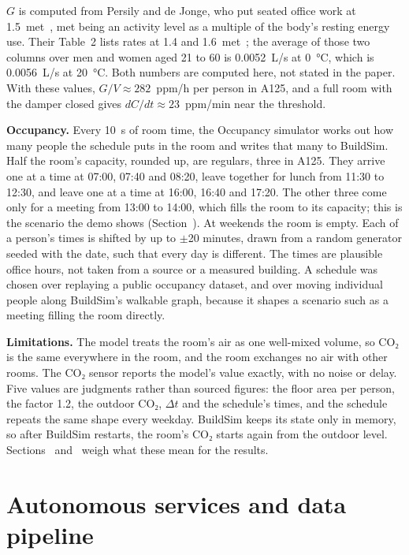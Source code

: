 \documentclass[11pt]{article}
\def\ref#1{\getrefnumber{#1}}%
\begin{document}
$G$ is computed from Persily and de Jonge, who put seated office work at
1.5~met~\cite[p.~3]{persily2017}, met being an activity level as a
multiple of the body's resting energy use. Their Table~2 lists rates at
1.4 and 1.6~met~\cite[p.~4]{persily2017}; the average of those two
columns over men and women aged 21 to 60 is 0.0052~L/s at 0~°C, which is
0.0056~L/s at 20~°C. Both numbers are computed here, not stated in the
paper. With these values, $G/V \approx 282$~ppm/h per person in A125,
and a full room with the damper closed gives
$dC/dt \approx 23$~ppm/min near the threshold.

\textbf{Occupancy.} Every 10~s of room time, the Occupancy simulator works
out how many people the schedule puts in the room and writes that many
to BuildSim. Half the room's capacity, rounded up, are regulars, three in
A125. They arrive one at a time at 07:00, 07:40 and 08:20, leave together
for lunch from 11:30 to 12:30, and leave one at a time at 16:00, 16:40
and 17:20. The other three come only for a meeting from 13:00 to 14:00,
which fills the room to its capacity; this is the scenario the demo
shows (Section~\ref{sec:usecase}). At weekends the room is empty. Each of
a person's times is shifted by up to $\pm$20 minutes, drawn from a random
generator seeded with the date, such that every day is different. The times are
plausible office hours, not taken from a source
or a measured building. A schedule was chosen over replaying a public
occupancy dataset, and over moving individual people along BuildSim's
walkable graph, because it shapes a scenario such as a meeting filling
the room directly.

\textbf{Limitations.} The model treats the room's air as one well-mixed
volume, so CO₂ is the same everywhere in the room, and the room exchanges
no air with other rooms. The CO₂ sensor reports the model's value
exactly, with no noise or delay. Five values are judgments rather than
sourced figures: the floor area per person, the factor 1.2, the outdoor
CO₂, $\Delta t$ and the schedule's times, and the schedule repeats the
same shape every weekday. BuildSim keeps its state only in memory, so
after BuildSim restarts, the room's CO₂ starts again from the outdoor
level. Sections~\ref{sec:evaluation} and~\ref{sec:risks} weigh what these mean for the results.

\section{Autonomous services and data pipeline}
\end{document}

